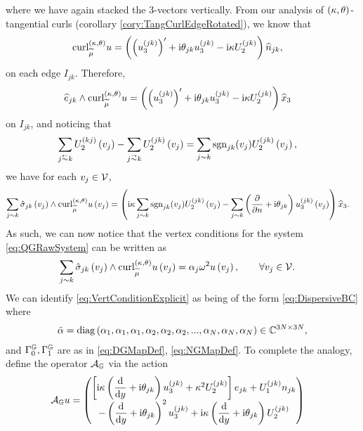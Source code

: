 where we have again stacked the 3-vectors vertically.
From our analysis of $\left( \kappa, \theta \right)$-tangential curls (corollary \ref{cory:TangCurlEdgeRotated}), we know that
\begin{align*}
	\mathrm{curl}_{\widetilde{\mu}}^{\left( \kappa, \theta \right)}u &= \left(  \left(  u_3^{(jk)}  \right)' + \mathrm{i}\theta_{jk}u_3^{(jk)} - \mathrm{i}\kappa U_2^{(jk)}  \right)\widehat{n}_{jk},
\end{align*}
on each edge $I_{jk}$.
Therefore, 
\begin{align*}
	\widehat{e}_{jk}\wedge\mathrm{curl}_{\widetilde{\mu}}^{\left( \kappa, \theta \right)}u &= \left(  \left(  u_3^{(jk)}  \right)' + \mathrm{i}\theta_{jk}u_3^{(jk)} - \mathrm{i}\kappa U_2^{(jk)}  \right)\widehat{x}_3
\end{align*}
on $I_{jk}$, and noticing that 
\begin{align*}
	\sum_{j\conRight k} U_2^{(kj)}\bracs{v_j} - \sum_{j\conLeft k} U_2^{(jk)}\bracs{v_j} &=
	\sum_{j\con k} \sgn_{jk}(v_j) U_2^{(jk)}\bracs{v_j},
\end{align*} 
we have for each $v_j\in\mathcal{V}$,
\begin{align*}
	\sum_{j\sim k} \hat{\sigma}_{jk}\left( v_j \right) \wedge \mathrm{curl}_{\widetilde{\mu}}^{\left( \kappa, \theta \right)}u\left( v_j \right)
	&= \left(  
	\mathrm{i}\kappa\sum_{j\sim k} \mathrm{sgn}_{jk}(v_j) U_2^{(jk)}\left( v_j \right)
	- \sum_{j\sim k}\left( \dfrac{\partial }{\partial n} + \mathrm{i}\theta_{jk} \right)u_3^{(jk)}\left( v_j \right)
	 \right) \widehat{x}_3.
\end{align*}
As such, we can now notice that the vertex conditions for the system \eqref{eq:QGRawSystem} can be written as
\begin{align} \label{eq:VertConditionExplicit}
	\sum_{j\sim k} \hat{\sigma}_{jk}\left( v_j \right) \wedge \mathrm{curl}_{\widetilde{\mu}}^{\left( \kappa, \theta \right)}u\left( v_j \right)
	&= \alpha_j\omega^2 u\left( v_j \right),
	\qquad \forall v_j\in\mathcal{V}.
\end{align}
We can identify \eqref{eq:VertConditionExplicit} as being of the form \eqref{eq:DispersiveBC} where
\begin{align*}
	\tilde{\alpha} = 
	\mathrm{diag}\left( \alpha_1, \alpha_1, \alpha_1, \alpha_2, \alpha_2, \alpha_2, ..., \alpha_N, \alpha_N, \alpha_N \right) \in \mathbb{C}^{3N\times 3N},
\end{align*}
and $\Gamma_0^{\mathbb{G}}, \Gamma_1^{\mathbb{G}}$ are as in \eqref{eq:DGMapDef}, \eqref{eq:NGMapDef}.
To complete the analogy, define the operator $\mathcal{A}_{\mathbb{G}}$ via the action
\begin{align*}
	\mathcal{A}_{\mathbb{G}} u &= 
	\begin{pmatrix}
		\left[  \mathrm{i}\kappa\left( \dfrac{\mathrm{d}}{\mathrm{d}y} + \mathrm{i}\theta_{jk}  \right)u_3^{(jk)} + \kappa^2 U_2^{(jk)}  \right]e_{jk}
		+ U_1^{(jk)} n_{jk} \\
		- \left( \dfrac{\mathrm{d}}{\mathrm{d}y} + \mathrm{i}\theta_{jk}  \right)^2 u_3^{(jk)} + \mathrm{i}\kappa \left( \dfrac{\mathrm{d}}{\mathrm{d}y} + \mathrm{i}\theta_{jk}  \right)U_2^{(jk)}
	\end{pmatrix}
\end{align*}
